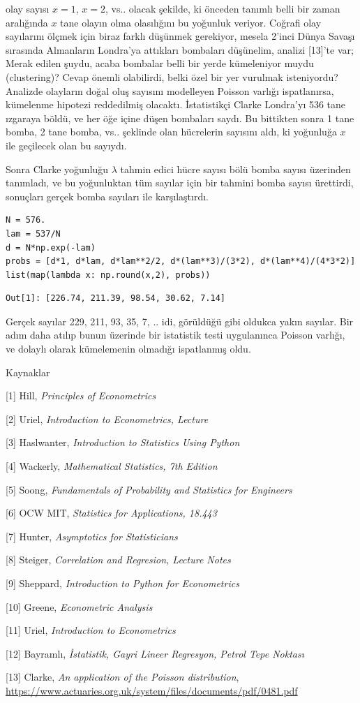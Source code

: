 \documentclass[12pt,fleqn]{article}\usepackage{../../common}
\begin{document}
olay sayısı $x=1$, $x=2$, vs.. olacak şekilde, ki önceden tanımlı belli bir
zaman aralığında $x$ tane olayın olma olasılığını bu yoğunluk veriyor. Coğrafi
olay sayılarını ölçmek için biraz farklı düşünmek gerekiyor, mesela 2'inci Dünya
Savaşı sırasında Almanların Londra'ya attıkları bombaları düşünelim, analizi
[13]'te var; Merak edilen şuydu, acaba bombalar belli bir yerde kümeleniyor
muydu (clustering)? Cevap önemli olabilirdi, belki özel bir yer vurulmak
isteniyordu? Analizde olayların doğal oluş sayısını modelleyen Poisson varlığı
ispatlanırsa, kümelenme hipotezi reddedilmiş olacaktı. İstatistikçi Clarke
Londra'yı 536 tane ızgaraya böldü, ve her öğe içine düşen bombaları saydı. Bu
bittikten sonra 1 tane bomba, 2 tane bomba, vs.. şeklinde olan hücrelerin
sayısını aldı, ki yoğunluğa $x$ ile geçilecek olan bu sayıydı.

Sonra Clarke yoğunluğu $\lambda$ tahmin edici hücre sayısı bölü bomba sayısı
üzerinden tanımladı, ve bu yoğunluktan tüm sayılar için bir tahmini bomba
sayısı ürettirdi, sonuçları gerçek bomba sayıları ile karşılaştırdı.

\begin{verbatim}
N = 576.
lam = 537/N
d = N*np.exp(-lam)
probs = [d*1, d*lam, d*lam**2/2, d*(lam**3)/(3*2), d*(lam**4)/(4*3*2)]
list(map(lambda x: np.round(x,2), probs))
\end{verbatim}

\begin{verbatim}
Out[1]: [226.74, 211.39, 98.54, 30.62, 7.14]
\end{verbatim}

Gerçek sayılar 229, 211, 93, 35, 7, .. idi, görüldüğü gibi oldukca yakın
sayılar. Bir adım daha atılıp bunun üzerinde bir istatistik testi
uygulanınca Poisson varlığı, ve dolaylı olarak kümelemenin olmadığı ispatlanmış
oldu.

Kaynaklar

[1] Hill, {\em Principles of Econometrics}

[2] Uriel, {\em Introduction to Econometrics, Lecture}

[3] Haslwanter, {\em Introduction to Statistics Using Python}

[4] Wackerly, {\em Mathematical Statistics, 7th Edition}

[5] Soong, {\em Fundamentals of Probability and Statistics for Engineers}

[6] OCW MIT, {\em Statistics for Applications, 18.443}

[7] Hunter, {\em Asymptotics for Statisticians}

[8] Steiger, {\em Correlation and Regresion, Lecture Notes}

[9] Sheppard, {\em Introduction to Python for Econometrics}

[10] Greene, {\em Econometric Analysis}

[11] Uriel, {\em Introduction to Econometrics}

[12] Bayramlı, {\em İstatistik, Gayri Lineer Regresyon, Petrol Tepe Noktası}

[13] Clarke, {\em An application of the Poisson distribution},
     \url{https://www.actuaries.org.uk/system/files/documents/pdf/0481.pdf}
\end{document}
